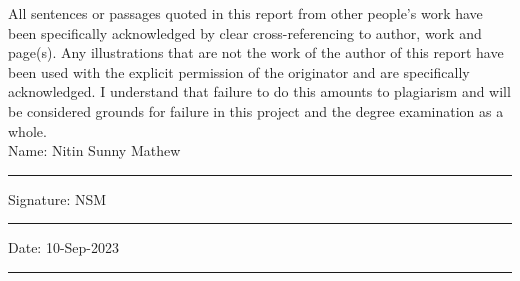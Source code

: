 \documentclass[11pt,oneside]{book}
\begin{document}
All sentences or passages quoted in this report from other people's work have been specifically acknowledged by clear cross-referencing to author, work and page(s). Any illustrations that are not the work of the author of this report have been used with the explicit permission of the originator and are specifically acknowledged. I understand that failure to do this amounts to plagiarism and will be considered grounds for failure in this project and the degree examination as a whole.\\[1cm]

\noindent Name: Nitin Sunny Mathew\\[1mm]
\rule[1em]{25em}{0.5pt}

\noindent Signature: NSM\\[1mm]
\rule[1em]{25em}{0.5pt}

\noindent Date: 10-Sep-2023\\[1mm]
\rule[1em]{25em}{0.5pt}



\tableofcontents
\listoffigures
\listoftables


\mainmatter












\begin{appendices}
    
    
\end{appendices}
\end{document}
